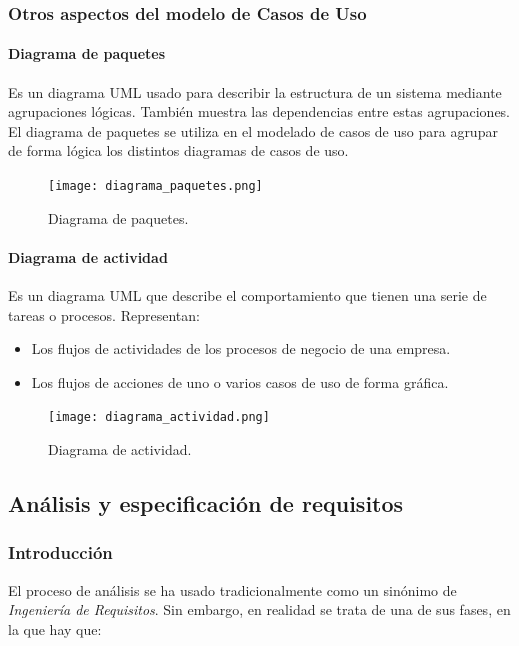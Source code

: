 \documentclass[12pt,spanish]{article}
\begin{document}
\subsubsection{Otros aspectos del modelo de Casos de Uso}

\paragraph{Diagrama de paquetes}
Es un diagrama UML usado para describir la estructura de un sistema mediante agrupaciones lógicas. También muestra las dependencias entre estas agrupaciones.\\
El diagrama de paquetes se utiliza en el modelado de casos de uso para agrupar de forma lógica los distintos diagramas de casos de uso.

\begin{figure}[H]
\centering
\texttt{[image: diagrama\_paquetes.png]}
\caption{Diagrama de paquetes.}
\end{figure}

\paragraph{Diagrama de actividad}

Es un diagrama UML que describe el comportamiento que tienen una serie de tareas o procesos. Representan:
\begin{itemize}
	\item Los flujos de actividades de los procesos de negocio de una empresa.
	\item Los flujos de acciones de uno o varios casos de uso de forma gráfica.
\end{itemize}

\begin{figure}[H]
\centering
\texttt{[image: diagrama\_actividad.png]}
\caption{Diagrama de actividad.}
\end{figure}

\newpage

\subsection{Análisis y especificación de requisitos}

\subsubsection{Introducción}

El proceso de análisis se ha usado tradicionalmente como un sinónimo de \emph{Ingeniería de Requisitos}. Sin embargo, en realidad se trata de una de sus fases, en la que hay que:
\end{document}
